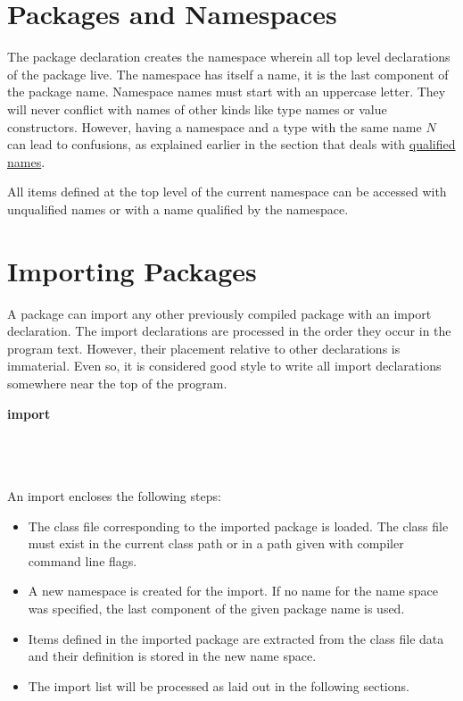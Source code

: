 \section{Packages and Namespaces}

The package declaration creates the namespace wherein all top level declarations 
of the package live. The namespace has itself a name,
it is the last component of the package name. Namespace names must start
with an uppercase letter. They will never conflict with names of other
kinds like type names or value constructors. 
However, having a namespace and a type with the same name $N$ can lead to confusions, as explained earlier in the section that deals with \hyperref[qualified names]{qualified names}.

All items defined at the top level of the current namespace can be
accessed with unqualified names or with a name qualified by the
namespace.

\section{Importing Packages} \label{import} 

A package can import any other previously compiled package with an import declaration.
The import declarations are processed in the order they occur in the program text. 
However, their placement relative to other declarations is immaterial. 
Even so, it is considered good style to write all import declarations somewhere near the top of the program.

\begin{flushleft}
 \textbf{import}   \\
  \sym{(}  \sym{)} \\
  \oder{}   \oder{}  \oder{} 
  \oder{}   \oder{}  \\
  \\
\end{flushleft}

An import encloses the following steps:
\begin{itemize}
\item The class file corresponding to the imported package is loaded.
The class file must exist in the current class path or in a path given
with compiler command line flags.
\item A new namespace is created for the import. If no name for the name
space was specified, the last component of the given package name is
used.
\item Items defined in the imported package are extracted from the class file
data and their definition is stored in the new name space.
\item The import list will be processed as laid out in the following sections.
\end{itemize}

